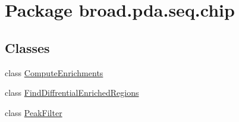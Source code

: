 \hypertarget{namespacebroad_1_1pda_1_1seq_1_1chip}{\section{Package broad.\+pda.\+seq.\+chip}
\label{namespacebroad_1_1pda_1_1seq_1_1chip}
}
\subsection*{Classes}
\begin{DoxyCompactItemize}
\item 
class \hyperlink{classbroad_1_1pda_1_1seq_1_1chip_1_1_compute_enrichments}{Compute\+Enrichments}
\item 
class \hyperlink{classbroad_1_1pda_1_1seq_1_1chip_1_1_find_diffrential_enriched_regions}{Find\+Diffrential\+Enriched\+Regions}
\item 
class \hyperlink{classbroad_1_1pda_1_1seq_1_1chip_1_1_peak_filter}{Peak\+Filter}
\end{DoxyCompactItemize}
